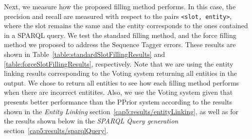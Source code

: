 Next, we measure how the proposed filling method performs. In this case, the precision and recall 
are measured with respect to the pairs \texttt{<slot, entity>}, where the slot remains the same 
and the entity corresponds to the ones contained in a SPARQL query. We test the standard filling 
method, and the force filling method we proposed to address the Sequence Tagger errors. These 
results are shown in Table~\ref{table:standardSlotFillingResults} and \ref{table:forceSlotFillingResults}, 
respectively. Note that we are using the entity linking results corresponding to the Voting system 
returning all entities in the output. We chose to return all entities to see how each filling
method performs when there are incorrect entitites. Also, we use the Voting system given that
presents better performance than the PPrior system according to the results shown in the 
\textit{Entity Linking} section~\ref{cap5:results/entityLinking}, as well as for the results shown 
below in the \textit{SPARQL Query generation} section~\ref{cap5:results/sparqlQuery}.

